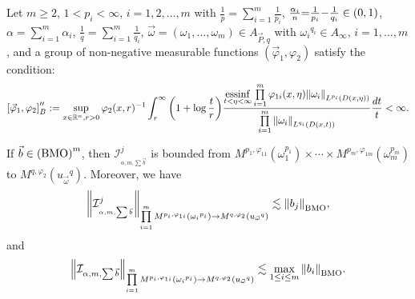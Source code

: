 \documentclass[11pt, twoside, leqno]{article}
\begin{document}
\begin{thm}\label{CFRI2}
	Let $m\geq 2$, $1< p_i<\infty$, $i=1,2,\ldots,m$ with $\frac{1}{p} = \sum\limits_{i = 1}^m {\frac{1}{{{p_i}}}}$, $\frac{{{\alpha _i}}}{n}{\rm{ = }}\frac{1}{{{p_i}}}{\rm{ - }}\frac{1}{{{q_i}}} \in (0,1)$, $\alpha  = \sum\limits_{i = 1}^m {{\alpha _i}}$, $\frac{1}{q} = \sum\limits_{i = 1}^m {\frac{1}{{{q_i}}}}$, $\vec{\omega}=(\omega_1,\ldots,\omega_m) \in {A_{\vec P,q}}$ with ${\omega _i}^{{q_i}} \in {A_\infty }$, $i = 1, \ldots ,m$, and a group of non-negative measurable functions $({{\vec \varphi }_1},{\varphi _2})$ satisfy the condition:
	\begin{equation}
	\left[ {{{\vec \varphi }_1},{\varphi _2}} \right]_B^{\prime \prime}: = \mathop {\sup }\limits_{x \in {{\mathbb R^n}},r > 0} {\varphi _2}{(x,r)^{{\rm{ - }}1}}\int_r^\infty  {{{\left( {1 + \log \frac{t}{r}} \right)}}\frac{{\mathop {{\rm{essinf}}}\limits_{t < \eta  < \infty } \prod\limits_{i = 1}^m {{\varphi _{1i}}(x,\eta ){{\left\| {{\omega _i}} \right\|}_{{L^{{p_i}}}(D(x,\eta ))}}} }}{{\prod\limits_{i = 1}^m {{{\left\| {{\omega _i}} \right\|}_{{L^{{q_i}}}(D(x,t))}}} }}\frac{{dt}}{t}}  < \infty.
	\end{equation}
	
	If $\vec b \in {\left( {\rm BMO} \right)^m}$, then ${{\mathcal I}_{_{\alpha ,m,\sum {\vec b} }}^j}$ is bounded from ${M^{{p_1},{\varphi _{11}}}}(\omega _1^{{p_1}}) \times  \cdots  \times {M^{{p_m},{\varphi _{1m}}}}(\omega _m^{{p_m}})$ to ${M^{q,{\varphi _2}}}({u_{\vec \omega }}^q)$.
	Moreover, we have 
	$${\left\| {{\mathcal I}_{_{\alpha ,m,\sum {\vec b} }}^j} \right\|_{\prod\limits_{i = 1}^m {{M^{{p_i},{\varphi _{1i}}}}\left( {{\omega _i}^{{p_i}}} \right)}  \to {M^{q,{\varphi _2}}}\left( {{u_{\vec \omega }}^q} \right)}} \lesssim {\left\| {{b_j}} \right\|_{\rm BMO}},$$ and 
	$${\left\| {{{\mathcal I}_{\alpha ,m,\sum {\vec b} }}} \right\|_{\prod\limits_{i = 1}^m {{M^{{p_i},{\varphi _{1i}}}}\left( {{\omega _i}^{{p_i}}} \right)}  \to {M^{q,{\varphi _2}}}\left( {{u_{\vec \omega }}^q} \right)}} \lesssim \mathop {\max }\limits_{1 \le i \le m} {\left\| {{b_i}} \right\|_{\rm BMO}}.$$
\end{thm}
\end{document}
